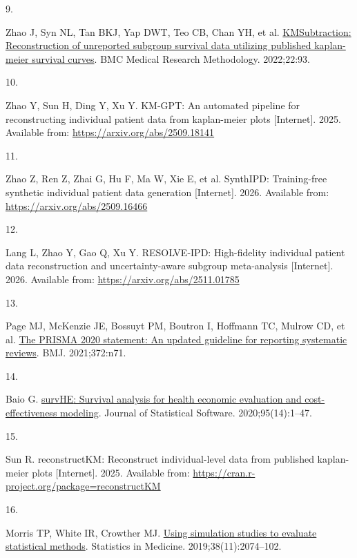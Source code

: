 \documentclass[
  english,
  letterpaper,
  DIV=11,
  numbers=noendperiod]{scrartcl}
\newlength{\cslhangindent}
\newlength{\csllabelwidth}
\newenvironment{CSLReferences}[2] %
 {\begin{list}{}{%
  \setlength{\itemindent}{0pt}
  \setlength{\leftmargin}{0pt}
  \setlength{\parsep}{0pt}
  \ifodd #1
   \setlength{\leftmargin}{\cslhangindent}
   \setlength{\itemindent}{-1\cslhangindent}
  \fi
  \setlength{\itemsep}{#2\baselineskip}}}
 {\end{list}}
\newcommand{\CSLLeftMargin}[1]{\parbox[t]{\csllabelwidth}{\strut#1\strut}}
\newcommand{\CSLRightInline}[1]{\parbox[t]{\linewidth - \csllabelwidth}{\strut#1\strut}}
\begin{document}
\begin{CSLReferences}{0}{1}
\CSLLeftMargin{9. }%
\CSLRightInline{Zhao J, Syn NL, Tan BKJ, Yap DWT, Teo CB, Chan YH, et
al. \href{https://doi.org/10.1186/s12874-022-01567-z}{{KMSubtraction}:
Reconstruction of unreported subgroup survival data utilizing published
kaplan-meier survival curves}. BMC Medical Research Methodology.
2022;22:93. }

\CSLLeftMargin{10. }%
\CSLRightInline{Zhao Y, Sun H, Ding Y, Xu Y. {KM-GPT}: An automated
pipeline for reconstructing individual patient data from kaplan-meier
plots {[}Internet{]}. 2025. Available from:
\url{https://arxiv.org/abs/2509.18141}}

\CSLLeftMargin{11. }%
\CSLRightInline{Zhao Z, Ren Z, Zhai G, Hu F, Ma W, Xie E, et al.
{SynthIPD}: Training-free synthetic individual patient data generation
{[}Internet{]}. 2026. Available from:
\url{https://arxiv.org/abs/2509.16466}}

\CSLLeftMargin{12. }%
\CSLRightInline{Lang L, Zhao Y, Gao Q, Xu Y. {RESOLVE-IPD}:
High-fidelity individual patient data reconstruction and
uncertainty-aware subgroup meta-analysis {[}Internet{]}. 2026. Available
from: \url{https://arxiv.org/abs/2511.01785}}

\CSLLeftMargin{13. }%
\CSLRightInline{Page MJ, McKenzie JE, Bossuyt PM, Boutron I, Hoffmann
TC, Mulrow CD, et al. \href{https://doi.org/10.1136/bmj.n71}{The
{PRISMA} 2020 statement: An updated guideline for reporting systematic
reviews}. BMJ. 2021;372:n71. }

\CSLLeftMargin{14. }%
\CSLRightInline{Baio G.
\href{https://doi.org/10.18637/jss.v095.i14}{{survHE}: Survival analysis
for health economic evaluation and cost-effectiveness modeling}. Journal
of Statistical Software. 2020;95(14):1--47. }

\CSLLeftMargin{15. }%
\CSLRightInline{Sun R. {reconstructKM}: Reconstruct individual-level
data from published kaplan-meier plots {[}Internet{]}. 2025. Available
from: \url{https://cran.r-project.org/package=reconstructKM}}

\CSLLeftMargin{16. }%
\CSLRightInline{Morris TP, White IR, Crowther MJ.
\href{https://doi.org/10.1002/sim.8086}{Using simulation studies to
evaluate statistical methods}. Statistics in Medicine.
2019;38(11):2074--102. }

\end{CSLReferences}
\end{document}
